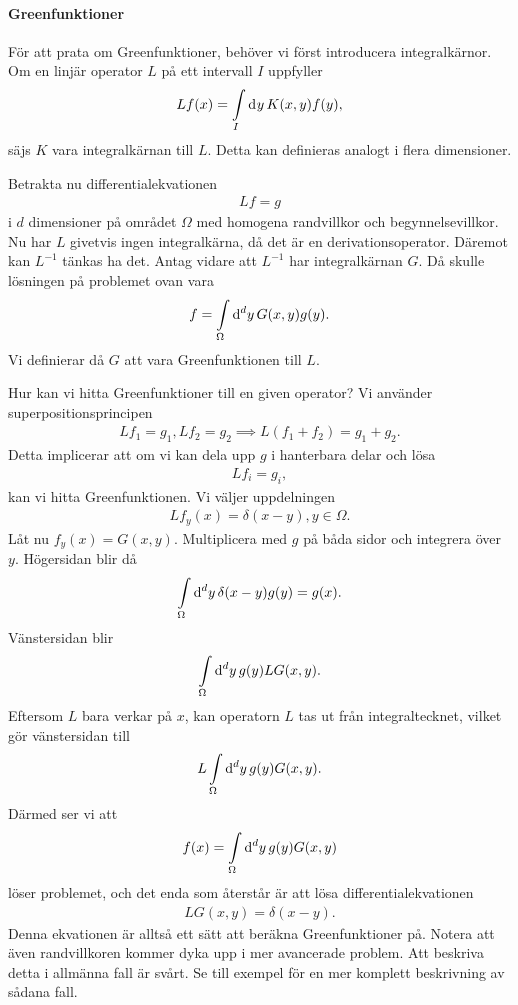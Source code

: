 \paragraph{Greenfunktioner}
För att prata om Greenfunktioner, behöver vi först introducera integralkärnor. Om en linjär operator $L$ på ett intervall $I$ uppfyller
\begin{align*}
	Lf(x) = \int\limits_{I}\dd[]{y}K(x, y)f(y),
\end{align*}
säjs $K$ vara integralkärnan till $L$. Detta kan definieras analogt i flera dimensioner.

Betrakta nu differentialekvationen
\begin{align*}
	Lf = g
\end{align*}
i $d$ dimensioner på området $\Omega$ med homogena randvillkor och begynnelsevillkor. Nu har $L$ givetvis ingen integralkärna, då det är en derivationsoperator. Däremot kan $L^{-1}$ tänkas ha det. Antag vidare att $L^{-1}$ har integralkärnan $G$. Då skulle lösningen på problemet ovan vara
\begin{align*}
	f = \int\limits_{\Omega}\dd[d]{y}G(x, y)g(y).
\end{align*}
Vi definierar då $G$ att vara Greenfunktionen till $L$.

Hur kan vi hitta Greenfunktioner till en given operator? Vi använder superpositionsprincipen
\begin{align*}
	Lf_{1} = g_{1}, Lf_{2} = g_{2} \implies L(f_{1} + f_{2}) = g_{1} + g_{2}.
\end{align*}
Detta implicerar att om vi kan dela upp $g$ i hanterbara delar och lösa
\begin{align*}
	Lf_{i} = g_{i},
\end{align*}
kan vi hitta Greenfunktionen. Vi väljer uppdelningen
\begin{align*}
	Lf_{y}(x) = \delta(x - y), y\in\Omega.
\end{align*}
Låt nu $f_{y}(x) = G(x, y)$. Multiplicera med $g$ på båda sidor och integrera över $y$. Högersidan blir då
\begin{align*}
	\int\limits_{\Omega}\dd[d]{y}\delta(x - y)g(y) = g(x).
\end{align*}
Vänstersidan blir
\begin{align*}
	\int\limits_{\Omega}\dd[d]{y}g(y)LG(x, y).
\end{align*}
Eftersom $L$ bara verkar på $x$, kan operatorn $L$ tas ut från integraltecknet, vilket gör vänstersidan till
\begin{align*}
	L\int\limits_{\Omega}\dd[d]{y}g(y)G(x, y).
\end{align*}
Därmed ser vi att
\begin{align*}
	f(x) = \int\limits_{\Omega}\dd[d]{y}g(y)G(x, y)
\end{align*}
löser problemet, och det enda som återstår är att lösa differentialekvationen
\begin{align*}
	LG(x, y) = \delta(x - y).
\end{align*}
Denna ekvationen är alltså ett sätt att beräkna Greenfunktioner på. Notera att även randvillkoren kommer dyka upp i mer avancerade problem. Att beskriva detta i allmänna fall är svårt. Se till exempel för en mer komplett beskrivning av sådana fall.

